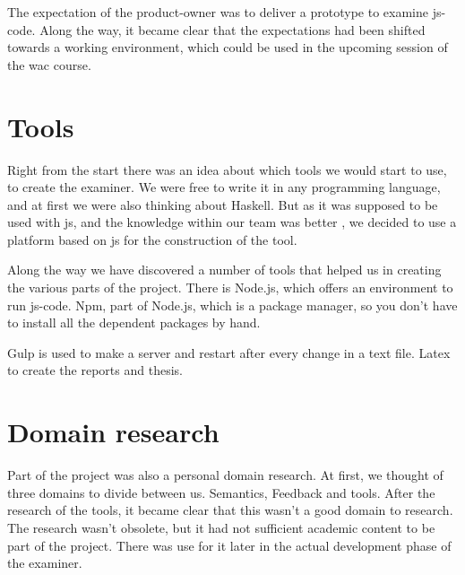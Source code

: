 The expectation of the product-owner was to deliver a prototype to examine \gls{js-code}.
Along the way, it became clear that the expectations had been shifted towards a working environment, which could be used in the upcoming session of the \gls{wac} course.

\section{Tools}

Right from the start there was an idea about which tools we would start to use, to create the examiner. We were free to write it in any programming language, and
at first we were also thinking about Haskell.			
But as it was supposed to be used with \gls{js}, and the knowledge within our
team was better %
, we decided to use a platform based on \gls{js} for the construction of the tool. 

Along the way we have discovered a number of tools that helped us in creating the various parts of the project.
There is Node.js, which offers an environment to run \gls{js-code}.
Npm, part of Node.js, which is a package manager, so you don't have to install
all the dependent packages by hand.

Gulp is used to make a server and restart after every change in a text file.
Latex to create the reports and thesis.

\section{Domain research}
Part of the project was also a personal domain research. At first, we thought of
three domains to divide between us.
Semantics, Feedback and tools.
After the research of the tools, it became clear that this wasn't a good domain
to research.
The research wasn't obsolete, but it had not sufficient academic content to be
part of the project.
There was use for it later in the actual development phase of the \gls{examiner}.